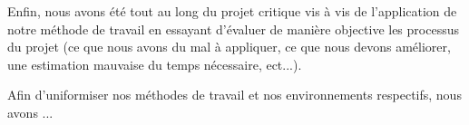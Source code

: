 Enfin, nous avons été tout au long du projet critique vis à vis de l'application de notre méthode de travail en essayant d'évaluer  de manière objective les processus du projet (ce que nous avons du mal à appliquer, ce que nous devons améliorer, une estimation mauvaise du temps nécessaire, ect...). 



Afin d'uniformiser nos méthodes de travail et nos environnements respectifs, nous avons ...



